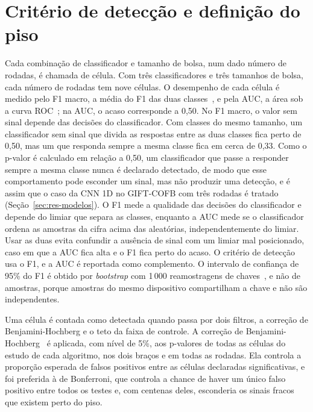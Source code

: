 \section{Critério de detecção e definição do piso}
\label{sec:met-criterio}

Cada combinação de classificador e tamanho de bolsa, num dado número de rodadas, é chamada de célula. Com três classificadores e três tamanhos de bolsa, cada número de rodadas tem nove células. O desempenho de cada célula é medido pelo F1 macro, a média do F1 das duas classes~\cite{Sokolova2009}, e pela AUC, a área sob a curva ROC~\cite{fawcett2006}; na AUC, o acaso corresponde a 0,50. No F1 macro, o valor sem sinal depende das decisões do classificador. Com classes do mesmo tamanho, um classificador sem sinal que divida as respostas entre as duas classes fica perto de 0,50, mas um que responda sempre a mesma classe fica em cerca de 0,33. Como o p-valor é calculado em relação a 0,50, um classificador que passe a responder sempre a mesma classe nunca é declarado detectado, de modo que esse comportamento pode esconder um sinal, mas não produzir uma detecção, e é assim que o caso da CNN 1D no GIFT-COFB com três rodadas é tratado (Seção~\ref{sec:res-modelos}). O F1 mede a qualidade das decisões do classificador e depende do limiar que separa as classes, enquanto a AUC mede se o classificador ordena as amostras da cifra acima das aleatórias, independentemente do limiar. Usar as duas evita confundir a ausência de sinal com um limiar mal posicionado, caso em que a AUC fica alta e o F1 fica perto do acaso. O critério de detecção usa o F1, e a AUC é reportada como complemento. O intervalo de confiança de 95\% do F1 é obtido por \textit{bootstrap} com 1\,000 reamostragens de chaves~\cite{FieldWelsh2007}, e não de amostras, porque amostras do mesmo dispositivo compartilham a chave e não são independentes.

Uma célula é contada como detectada quando passa por dois filtros, a correção de Benjamini-Hochberg e o teto da faixa de controle. A correção de Benjamini-Hochberg~\cite{Benjamini1995FDR} é aplicada, com nível de 5\%, aos p-valores de todas as células do estudo de cada algoritmo, nos dois braços e em todas as rodadas. Ela controla a proporção esperada de falsos positivos entre as células declaradas significativas, e foi preferida à de Bonferroni, que controla a chance de haver um único falso positivo entre todos os testes e, com centenas deles, esconderia os sinais fracos que existem perto do piso.

